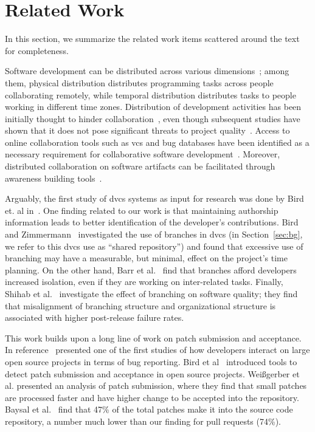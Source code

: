 \documentclass{acm_proc_article-sp}
\begin{document}
\section{Related Work}

In this section, we summarize the related work items scattered around
the text for completeness.

Software development can be distributed across various
dimensions~\cite{Gumm06}; among them, physical distribution distributes
programming tasks across people collaborating remotely, while temporal
distribution distributes tasks to people working in different time zones.
Distribution of development activities has been initially thought to hinder
collaboration~\cite{Herbs99, Batti01}, even though subsequent studies have
shown that it does not pose significant threats to project
quality~\cite{Spine06, Nguye08, Bird09a}. Access to online collaboration tools
such as {\sc vcs} and bug databases have been identified as a necessary
requirement for collaborative software development~\cite{Knuds76,Pilat06,
Catal06}. Moreover, distributed collaboration on software artifacts can be
facilitated through awareness building tools~\cite{Dabbi12, Treud12, Lanza10}. 

Arguably, the first study of {\sc dvcs} systems as input for research was done
by Bird et. al in~\cite{Bird09}. One finding related to our work is that
maintaining authorship information leads to better identification of the
developer's contributions. Bird and Zimmermann~\cite{Bird12} investigated the
use of branches in {\sc dvcs} (in Section~\ref{sec:bg}, we refer to this {\sc
dvcs} use as ``shared repository'') and found that excessive use of branching
may have a measurable, but minimal, effect on the project's time planning.
On the other hand, Barr et al.~\cite{Barr12} find that branches afford developers
increased isolation, even if they are working on inter-related tasks.
Finally, Shihab et al.~\cite{Shiha12} investigate the effect of branching on
software quality; they find that misalignment of branching structure and organizational structure is associated with higher post-release failure rates.

This work builds upon a long line of work on patch submission and acceptance.
In reference~\cite{MOCKU02} presented one of the first studies of how developers
interact on large open source projects in terms of bug reporting. Bird et
al~\cite{Bird07a} introduced tools to detect patch submission and acceptance in
open source projects. Wei\ss gerber et al. presented an analysis of patch
submission, where they find that small patches are processed faster and have
higher change to be accepted into the repository. Baysal et al.~\cite{Baysa12}
find that 47\% of the total patches make it into the source code repository, a
number much lower than our finding for pull requests (74\%).
\end{document}
